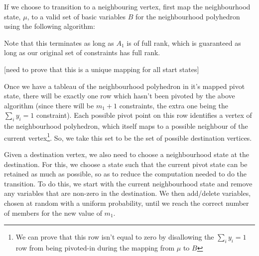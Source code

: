 \documentclass{article}
\begin{document}
If we choose to transition to a neighbouring vertex, first map the neighbourhood state, $\mu$, to a valid set of basic variables $B$ for the neighbourhood polyhedron using the following algorithm:


Note that this terminates as long as $A_1$ is of full rank, which is guaranteed as long as our original set of constraints has full rank.

[need to prove that this is a unique mapping for all start states]

Once we have a tableau of the neighbourhood polyhedron in it's mapped pivot state, there will be exactly one row which hasn't been pivoted by the above algorithm (since there will be $m_1+1$ constraints, the extra one being the $\sum_i y_i = 1$ constraint). Each possible pivot point on this row identifies a vertex of the neighbourhood polyhedron, which itself maps to a possible neighbour of the current vertex\footnote{We can prove that this row isn't equal to zero by disallowing the $\sum_i y_i = 1$ row  from being pivoted-in during the mapping from $\mu$ to $B$}. So, we take this set to be the set of possible destination vertices.


Given a destination vertex, we also need to choose a neighbourhood state at the destination. For this, we choose a state such that the current pivot state can be retained as much as possible, so as to reduce the computation needed to do the transition. To do this, we start with the current neighbourhood state and remove any variables that are non-zero in the destination. We then add/delete variables, chosen at random with a uniform probability, until we reach the correct number of members for the new value of $m_1$.
\end{document}

